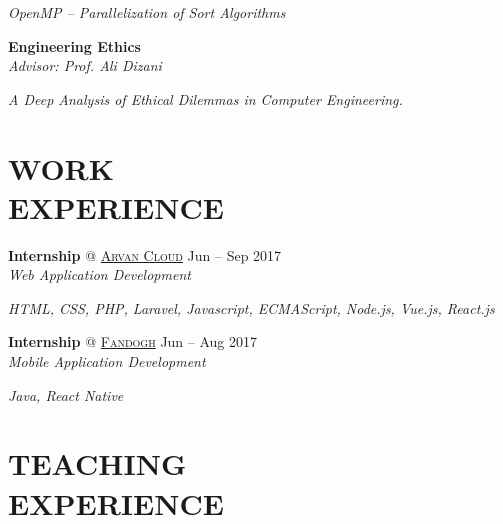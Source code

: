\documentclass[margin, 10pt]{res} %
\begin{document}
\begin{resume}
\begin{innerlist}
				\item \textit{OpenMP -- Parallelization of Sort Algorithms} \href{https://github.com/aligholamee/Parallax/raw/master/docs/assignment-3/MCP_9531504_HW3.pdf}{\hfill\UrlFont[docs]}

			\end{innerlist}

        \textbf{Engineering Ethics}\\
		\textit{Advisor: Prof. Ali Dizani}
		\begin{innerlist}
			\item \textit{A Deep Analysis of Ethical Dilemmas in Computer Engineering.} \href{https://www.dropbox.com/s/hysshvi811nqwm4/Release_1_0_0.pdf?dl=0}{\hfill\UrlFont[docs]}
			
		\end{innerlist}
		
    
    \section{WORK \\ EXPERIENCE}
	\textbf{Internship} \textsc{@}
	\href{https://www.arvancloud.com/}{\textsc{Arvan Cloud}}
	\hfill {Jun -- Sep 2017}\\
	\textit{Web Application Development}
	\begin{innerlist}
		\item \textit{HTML, CSS, PHP, Laravel, Javascript, ECMAScript, Node.js, Vue.js, React.js}
	\end{innerlist}
	
	\textbf{Internship} \textsc{@}
	\href{http://www.fandogh.org/}{\textsc{Fandogh}}
	\hfill {Jun -- Aug 2017}\\
	\textit{Mobile Application Development}
	\begin{innerlist}
		\item \textit{Java, React Native}
	\end{innerlist}

    
    \section{TEACHING \\ EXPERIENCE} 
    

\end{resume}
\end{document}
